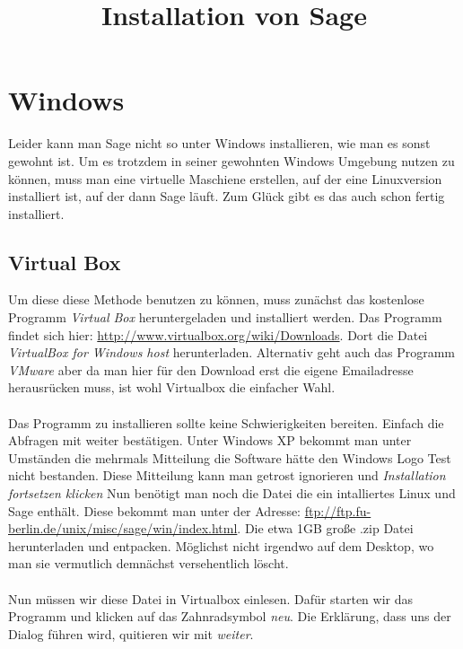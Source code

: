\documentclass[a4paper,10pt]{article}
\title{Installation von Sage}
\begin{document}
\maketitle
\section{Windows}
Leider kann man Sage nicht so unter Windows installieren, wie man es sonst gewohnt ist. Um es trotzdem in seiner gewohnten Windows
Umgebung nutzen zu können, muss man eine virtuelle Maschiene erstellen, auf der eine Linuxversion installiert ist, auf der dann 
Sage läuft. 
Zum Glück gibt es das auch schon fertig installiert. 

\subsection{Virtual Box}
Um diese diese Methode benutzen zu können, muss zunächst das kostenlose Programm \emph{Virtual Box} heruntergeladen und installiert werden. 
Das Programm findet sich hier: \url{http://www.virtualbox.org/wiki/Downloads}. Dort die Datei \emph{VirtualBox for Windows host} herunterladen.
Alternativ geht auch das Programm \emph{VMware} aber 
da man hier für den Download erst die eigene Emailadresse herausrücken muss, ist wohl Virtualbox die einfacher Wahl.
\paragraph{}
Das Programm zu installieren sollte keine Schwierigkeiten bereiten. Einfach die Abfragen mit weiter bestätigen. Unter Windows XP bekommt
man unter Umständen die mehrmals Mitteilung die Software hätte den Windows Logo Test nicht bestanden. Diese Mitteilung kann man 
getrost ignorieren und \emph{Installation fortsetzen klicken} Nun benötigt man noch
die Datei die ein intalliertes Linux und Sage enthält. Diese bekommt man unter der Adresse:
 \url{ftp://ftp.fu-berlin.de/unix/misc/sage/win/index.html}. Die etwa 1GB große .zip Datei herunterladen und entpacken.
Möglichst nicht irgendwo auf dem Desktop, wo man sie vermutlich demnächst versehentlich löscht. 
\paragraph{}
Nun müssen wir diese Datei in Virtualbox einlesen. Dafür starten wir das Programm und klicken auf das Zahnradsymbol 
\emph{neu}. Die Erklärung, dass uns der Dialog führen wird, quitieren wir mit \emph{weiter}.
\end{document}
